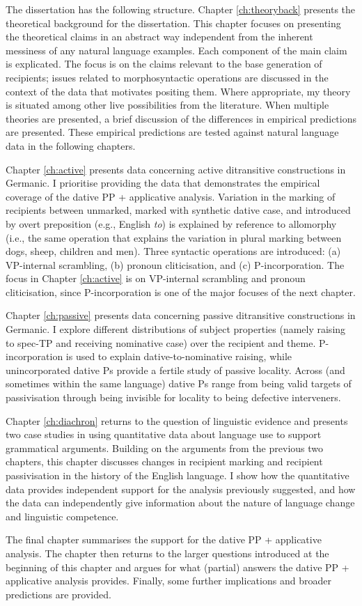 The dissertation has the following structure. Chapter \ref{ch:theoryback} presents the theoretical background for the dissertation. This chapter focuses on presenting the theoretical claims in an abstract way independent from the inherent messiness of any natural language examples. Each component of the main claim is explicated. The focus is on the claims relevant to the base generation of recipients; issues related to morphosyntactic operations are discussed in the context of the data that motivates positing them. Where appropriate, my theory is situated among other live possibilities from the literature. When multiple theories are presented, a brief discussion of the differences in empirical predictions are presented. These empirical predictions are tested against natural language data in the following chapters.

Chapter \ref{ch:active} presents data concerning active ditransitive constructions in Germanic. I prioritise providing the data that demonstrates the empirical coverage of the dative PP + applicative analysis. Variation in the marking of recipients between unmarked, marked with synthetic dative case, and introduced by overt preposition (e.g., English \textit{to}) is explained by reference to allomorphy (i.e., the same operation that explains the variation in plural marking between dogs, sheep, children and men). Three syntactic operations are introduced: (a) VP-internal scrambling, (b) pronoun cliticisation, and (c) P-incorporation. The focus in Chapter \ref{ch:active} is on VP-internal scrambling and pronoun cliticisation, since P-incorporation is one of the major focuses of the next chapter.

Chapter \ref{ch:passive} presents data concerning passive ditransitive constructions in Germanic. I explore different distributions of subject properties (namely raising to spec-TP and receiving nominative case) over the recipient and theme. P-incorporation is used to explain dative-to-nominative raising, while unincorporated dative Ps provide a fertile study of passive locality. Across (and sometimes within the same language) dative Ps range from being valid targets of passivisation through being invisible for locality to being defective interveners.

Chapter \ref{ch:diachron} returns to the question of linguistic evidence and presents two case studies in using quantitative data about language use to support grammatical arguments. Building on the arguments from the previous two chapters, this chapter discusses changes in recipient marking and recipient passivisation in the history of the English language. I show how the quantitative data provides independent support for the analysis previously suggested, and how the data can independently give information about the nature of language change and linguistic competence.

The final chapter summarises the support for the dative PP + applicative analysis. The chapter then returns to the larger questions introduced at the beginning of this chapter and argues for what (partial) answers the dative PP + applicative analysis provides. Finally, some further implications and broader predictions are provided. 
%
